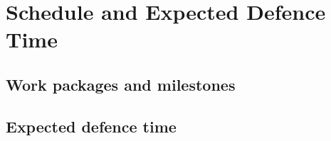 
\chapter{Schedule and Expected Defence Time}
\label{chap:schedule}

\section{Work packages and milestones}

\section{Expected defence time}
